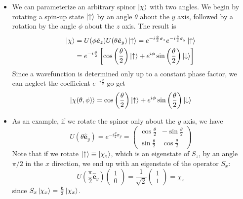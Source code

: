 \documentclass[11pt, a4paper]{article}
\renewcommand{\vec}[1]{\bm{#1}}  %
\newcommand{\uvec}[1]{\hat{\vec{#1}}}  %
\newcommand{\ua}{\uparrow}  %
\newcommand{\da}{\downarrow}  %
\begin{document}
\begin{itemize}
	\item We can parameterize an arbitrary spinor $ \ket{\chi} $ with two angles. We begin by rotating a spin-up state $ \ket{\ua} $ by an angle $ \theta $ about the $ y $ axis, followed by a rotation by the angle $ \phi $ about the $ z $ axis. The result is
	\begin{align*}
		\ket{\chi} &= U(\phi \uvec{e}_{z})U(\theta \uvec{e}_{y})\ket{\ua} = e^{-i\frac{\phi}{2}\sigma_{z}} e^{-i\frac{\theta}{2}\sigma_{y}}\ket{\ua}\\
		& = e^{-i\frac{\phi}{2}}\left[\cos \left(\frac{\theta}{2}\right)\ket{\ua} + e^{i \phi} \sin \left(\frac{\theta}{2}\right)\ket{\da}\right]
	\end{align*}
	Since a wavefunction is determined only up to a constant phase factor, we can neglect the coefficient $ e^{-i\frac{\phi}{2}} $ go get
	\begin{equation*}
		\ket{\chi(\theta, \phi)} = \cos \left(\frac{\theta}{2}\right)\ket{\ua} + e^{i \phi} \sin \left(\frac{\theta}{2}\right)\ket{\da}
	\end{equation*}
	
	\item As an example, if we rotate the spinor only about the $ y $ axis, we have
	\begin{equation*}
		U(\theta \uvec{e}_{y}) = e^{-i\frac{\theta}{2}\sigma_{y}} = 
		\begin{pmatrix}
			\cos \frac{\theta}{2} & - \sin \frac{\theta}{2} \\
			\sin \frac{\theta}{2} & \cos \frac{\theta}{2} 
		\end{pmatrix}
	\end{equation*}
	Note that if we rotate $ \ket{\ua} \equiv \ket{\chi_{z}} $, which is an eigenstate of $ S_{z} $, by an angle $ \pi/2 $ in the $ x $ direction, we end up with an eigenstate of the operator $ S_{x} $:
	\begin{equation*}
		U\left(\frac{\pi}{2}\uvec{e}_{y} \right) 
		\begin{pmatrix}
			1\\
			0
		\end{pmatrix}
		= \frac{1}{\sqrt{2}} 
		\begin{pmatrix}
			1\\
			1
		\end{pmatrix}
		= \chi_{x}
	\end{equation*}
	since $ S_{x}\ket{\chi_{x}} = \frac{\hbar}{2}\ket{\chi_{x}} $. 
	

\end{itemize}
\end{document}
